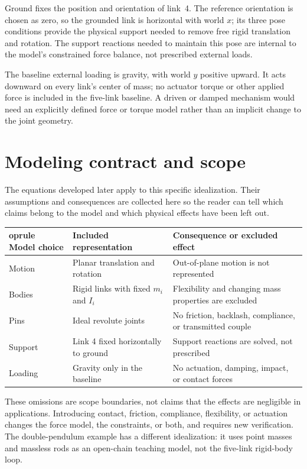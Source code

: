 \documentclass[../main.tex]{subfiles}
\begin{document}
Ground fixes the position and orientation of link~4. The reference orientation is chosen as zero, so the grounded link is horizontal with world $x$; its three pose conditions provide the physical support needed to remove free rigid translation and rotation. The support reactions needed to maintain this pose are internal to the model's constrained force balance, not prescribed external loads.

The baseline external loading is gravity, with world $y$ positive upward. It acts downward on every link's center of mass; no actuator torque or other applied force is included in the five-link baseline. A driven or damped mechanism would need an explicitly defined force or torque model rather than an implicit change to the joint geometry.

\section{Modeling contract and scope}

The equations developed later apply to this specific idealization. Their assumptions and consequences are collected here so the reader can tell which claims belong to the model and which physical effects have been left out.

\begin{center}
\small
\begin{tabular}{@{}>{\raggedright\arraybackslash}p{}>{\raggedright\arraybackslash}p{}>{\raggedright\arraybackslash}p{}@{}}
	oprule
Model choice & Included representation & Consequence or excluded effect \\
\midrule
Motion & Planar translation and rotation & Out-of-plane motion is not represented \\
Bodies & Rigid links with fixed $m_i$ and $I_i$ & Flexibility and changing mass properties are excluded \\
Pins & Ideal revolute joints & No friction, backlash, compliance, or transmitted couple \\
Support & Link 4 fixed horizontally to ground & Support reactions are solved, not prescribed \\
Loading & Gravity only in the baseline & No actuation, damping, impact, or contact forces \\
\bottomrule
\end{tabular}
\end{center}

These omissions are scope boundaries, not claims that the effects are negligible in applications. Introducing contact, friction, compliance, flexibility, or actuation changes the force model, the constraints, or both, and requires new verification. The double-pendulum example has a different idealization: it uses point masses and massless rods as an open-chain teaching model, not the five-link rigid-body loop.
\end{document}
